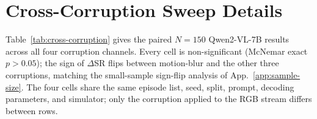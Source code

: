 \section{Cross-Corruption Sweep Details}
\label{app:cross-corruption}



Table~\ref{tab:cross-corruption} gives the paired
$N{=}150$ Qwen2-VL-7B results across all four corruption channels. Every
cell is non-significant (McNemar exact $p{>}0.05$); the sign of
$\Delta$SR flips between motion-blur and the other three corruptions,
matching the small-sample sign-flip analysis of
App.~\ref{app:sample-size}. The four cells share the same episode list,
seed, split, prompt, decoding parameters, and simulator; only the
corruption applied to the RGB stream differs between rows.
